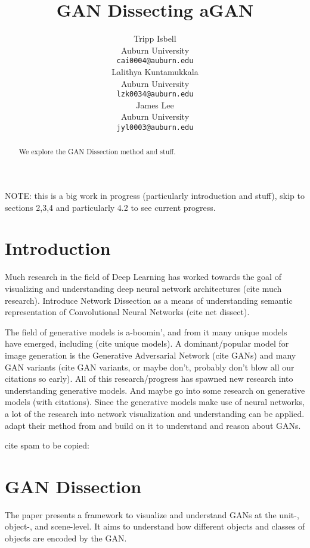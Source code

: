 \documentclass{article}
\title{GAN Dissecting aGAN}
\author{%
  Tripp Isbell\\
  Auburn University\\
  \texttt{cai0004@auburn.edu} \\
  \And
 Lalithya Kuntamukkala\\
 Auburn University\\
 \texttt{lzk0034@auburn.edu}\\
  \And
  James Lee\\
  Auburn University\\
  \texttt{jyl0003@auburn.edu}\\
}
\begin{document}
\maketitle

\begin{abstract}
We explore the GAN Dissection method and stuff.
\end{abstract}

NOTE: this is a big work in progress (particularly introduction and stuff), skip to sections 2,3,4 and particularly 4.2 to see current progress.

\section{Introduction}


Much research in the field of Deep Learning has worked towards the goal of visualizing and understanding deep neural network architectures (cite much research). Introduce Network Dissection as a means of understanding semantic representation of Convolutional Neural Networks (cite net dissect). 

The field of generative models is a-boomin', and from it many unique models have emerged, including (cite unique models). A dominant/popular model for image generation is the Generative Adversarial Network (cite GANs) and many GAN variants (cite GAN variants, or maybe don't, probably don't blow all our citations so early). All of this research/progress has spawned new research into understanding generative models. And maybe go into some research on generative models (with citations). Since the generative models make use of neural networks, a lot of the research into network visualization and understanding can be applied. \citet{gandissect2019} adapt their method from \cite{netdissect2017} and build on it to understand and reason about GANs. 

cite spam to be copied:
\citet{netdissect2017}
\citet{gandissect2019}
\citet{progan2017}
\citet{stylegan2018}
\citet{gan2014}
\citet{synthesizing2016}
\citet{deepvis2015}

\section{GAN Dissection}

The paper presents a framework to visualize and understand GANs at the unit-, object-, and scene-level. It aims to understand how different objects and classes of objects are encoded by the GAN.
\end{document}
